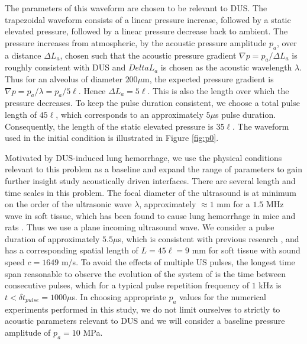 \documentclass{jfm}%
\begin{document}
The parameters of this waveform are chosen to be relevant to
\ac{DUS}. The trapezoidal waveform consists of a linear pressure
increase, followed by a static elevated pressure, followed by a linear
pressure decrease back to ambient. The pressure increases from
atmospheric, by the acoustic pressure amplitude $p_a$, over a distance
$\Delta L_a$, chosen such that the acoustic pressure gradient
$\nabla p = p_a/\Delta L_a$ is roughly consistent with \ac{DUS} and
$Delta L_a$ is chosen as the acoustic wavelength $\lambda$. Thus for
an alveolus of diameter $200 \mu$m, the expected pressure gradient is
$\nabla p = p_a/\lambda = p_a/5\ell$. Hence $\Delta L_a = 5\ell$. This is
also the length over which the pressure decreases. To keep the pulse
duration consistent, we choose a total pulse length of $45\ell$, which
corresponds to an approximately $5 \mu$s pulse duration. Consequently,
the length of the static elevated pressure is $35\ell$. The waveform
used in the initial condition is illustrated in Figure \ref{fig:p0}.

Motivated by \ac{DUS}-induced lung hemorrhage, we use the physical
conditions relevant to this problem as a baseline and expand the range
of parameters to gain further insight study acoustically driven
interfaces. There are several length and time scales in this
problem. The focal diameter of the ultrasound is at minimum on the
order of the ultrasonic wave $\lambda$, approximately $\approx 1$ mm
for a $1.5$ MHz wave in soft tissue, which has been found to cause
lung hemorrhage in mice and rats \citep{Child1990,Miller2015a}. Thus
we use a plane incoming ultrasound wave. We consider a pulse duration
of approximately $5.5 \mu$s, which is consistent with previous
research \citep{Child1990}, and has a corresponding spatial length of
$L=45\ell = 9$ mm for soft tissue with sound speed $c=1649$ m/s. To
avoid the effects of multiple \ac{US} pulses, the longest time span
reasonable to observe the evolution of the system of is the time
between consecutive pulses, which for a typical pulse repetition
frequency of $1$ kHz is $t<\delta t_{pulse}=1000 \mu$s. In choosing
appropriate $p_a$ values for the numerical experiments performed in
this study, we do not limit ourselves to strictly to acoustic
parameters relevant to \ac{DUS} and we will consider a baseline
pressure amplitude of $p_a = 10$ MPa.
\end{document}
